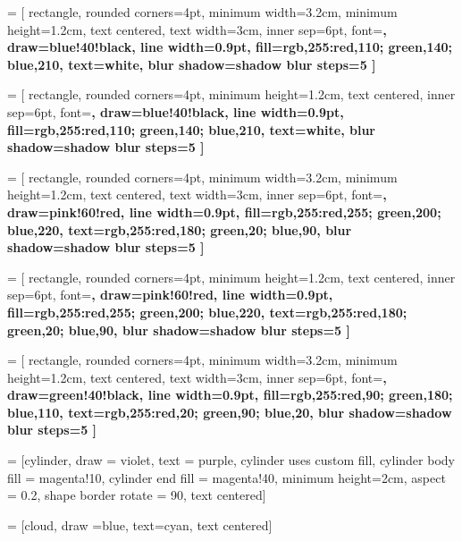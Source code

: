 

 = [
    rectangle,
    rounded corners=4pt,
    minimum width=3.2cm,
    minimum height=1.2cm,
    text centered,
    text width=3cm,
    inner sep=6pt,
    font=\bfseries\small,
    draw=blue!40!black,
    line width=0.9pt,
    fill={rgb,255:red,110; green,140; blue,210},
    text=white,
    blur shadow={shadow blur steps=5}
]

 = [
    rectangle,
    rounded corners=4pt,
    minimum height=1.2cm,
    text centered,
    inner sep=6pt,
    font=\bfseries\small,
    draw=blue!40!black,
    line width=0.9pt,
    fill={rgb,255:red,110; green,140; blue,210},
    text=white,
    blur shadow={shadow blur steps=5}
]

 = [
    rectangle,
    rounded corners=4pt,
    minimum width=3.2cm,
    minimum height=1.2cm,
    text centered,
    text width=3cm,
    inner sep=6pt,
    font=\bfseries\small,
    draw=pink!60!red,
    line width=0.9pt,
    fill={rgb,255:red,255; green,200; blue,220}, %
    text={rgb,255:red,180; green,20; blue,90},   %
    blur shadow={shadow blur steps=5}
]

 = [
    rectangle,
    rounded corners=4pt,
    minimum height=1.2cm,
    text centered,
    inner sep=6pt,
    font=\bfseries\small,
    draw=pink!60!red,
    line width=0.9pt,
    fill={rgb,255:red,255; green,200; blue,220}, %
    text={rgb,255:red,180; green,20; blue,90},   %
    blur shadow={shadow blur steps=5}
]

 = [
    rectangle,
    rounded corners=4pt,
    minimum width=3.2cm,
    minimum height=1.2cm,
    text centered,
    text width=3cm,
    inner sep=6pt,
    font=\bfseries\small,
    draw=green!40!black,
    line width=0.9pt,
    fill={rgb,255:red,90; green,180; blue,110},
    text={rgb,255:red,20; green,90; blue,20},
    blur shadow={shadow blur steps=5}
]

 = [cylinder, 
    draw = violet, 
    text = purple,
    cylinder uses custom fill, 
    cylinder body fill = magenta!10, 
    cylinder end fill = magenta!40,
    minimum height=2cm,
    aspect = 0.2, 
    shape border rotate = 90, 
    text centered]

 = [cloud,
	draw =blue,
	text=cyan,
    text centered]

